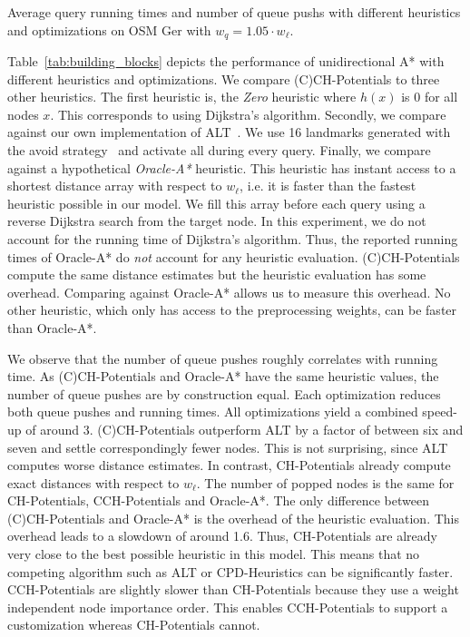 \documentclass[manuscript,review]{acmart}
\begin{document}
\begin{table}
\centering
\caption{Average query running times and number of queue pushs with different heuristics and optimizations on OSM Ger with $w_q = 1.05 \cdot w_\ell$.}\label{tab:building_blocks}

\end{table}

Table~\ref{tab:building_blocks} depicts the performance of unidirectional A* with different heuristics and optimizations.
We compare (C)CH-Potentials to three other heuristics.
The first heuristic is, the \emph{Zero} heuristic where $h(x)$ is $0$ for all nodes $x$.
This corresponds to using Dijkstra's algorithm.
Secondly, we compare against our own implementation of ALT~\cite{gw-cppsp-05}.
We use 16 landmarks generated with the avoid strategy~\cite{gw-cppsp-05} and activate all during every query.
Finally, we compare against a hypothetical \emph{Oracle-A*} heuristic.
This heuristic has instant access to a shortest distance array with respect to $w_\ell$, i.e. it is faster than the fastest heuristic possible in our model.
We fill this array before each query using a reverse Dijkstra search from the target node.
In this experiment, we do not account for the running time of Dijkstra's algorithm.
Thus, the reported running times of Oracle-A* do \emph{not} account for any heuristic evaluation.
(C)CH-Potentials compute the same distance estimates but the heuristic evaluation has some overhead.
Comparing against Oracle-A* allows us to measure this overhead.
No other heuristic, which only has access to the preprocessing weights, can be faster than Oracle-A*.

We observe that the number of queue pushes roughly correlates with running time.
As (C)CH-Potentials and Oracle-A* have the same heuristic values, the number of queue pushes are by construction equal.
Each optimization reduces both queue pushes and running times.
All optimizations yield a combined speed-up of around 3.
(C)CH-Potentials outperform ALT by a factor of between six and seven and settle correspondingly fewer nodes.
This is not surprising, since ALT computes worse distance estimates.
In contrast, CH-Potentials already compute exact distances with respect to $w_\ell$.
The number of popped nodes is the same for CH-Potentials, CCH-Potentials and Oracle-A*.
The only difference between (C)CH-Potentials and Oracle-A* is the overhead of the heuristic evaluation.
This overhead leads to a slowdown of around 1.6.
Thus, CH-Potentials are already very close to the best possible heuristic in this model.
This means that no competing algorithm such as ALT or CPD-Heuristics can be significantly faster.
CCH-Potentials are slightly slower than CH-Potentials because they use a weight independent node importance order.
This enables CCH-Potentials to support a customization whereas CH-Potentials cannot.
\end{document}
